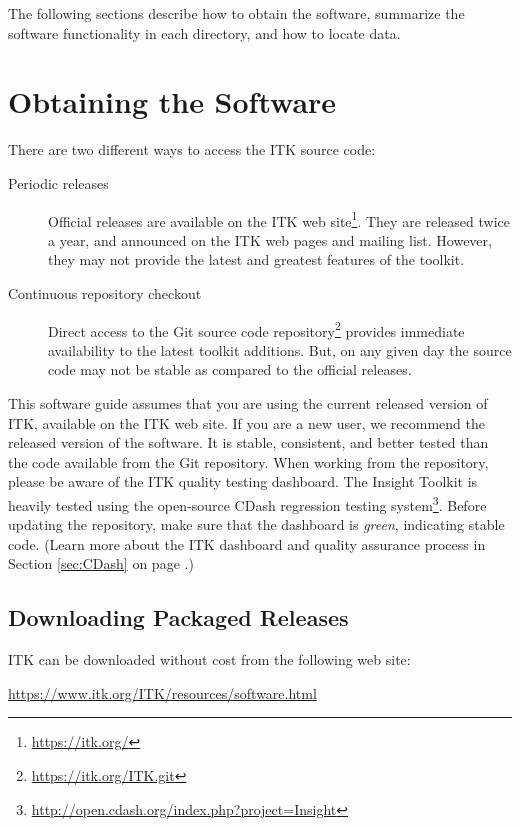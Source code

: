 The following sections describe how to obtain the software, summarize the
software functionality in each directory, and how to locate data.

\section{Obtaining the Software}
\label{sec:ObtainingTheSoftware}
\label{sec:DownloadingITK}

There are two different ways to access the ITK source code:
\begin{description}
  \item[Periodic releases]{Official releases are available on the ITK web
    site\footnote{\url{https://itk.org/}}. They are released twice a year,
    and announced on the ITK web pages and mailing list.
    However, they may not provide the latest and greatest features of the
    toolkit.}
  \item[Continuous repository checkout]{Direct access to the Git source code
    repository\footnote{\url{https://itk.org/ITK.git}} provides immediate
    availability to the latest toolkit additions. But, on any given day the
    source code may not be stable as compared to the official releases.}
\end{description}

This software guide assumes that you are using the current released version of
ITK, available on the ITK web site. If you are a new user, we recommend the
released version of the software. It is stable, consistent, and better tested
than the code available from the Git repository.  When working from the
repository, please be aware of the ITK quality testing dashboard. The Insight
Toolkit is heavily tested using the open-source CDash regression testing
system\footnote{\url{http://open.cdash.org/index.php?project=Insight}}. Before
updating the repository, make sure that the dashboard is \emph{green},
indicating stable code. (Learn more about the ITK dashboard and quality
assurance process in Section \ref{sec:CDash} on page \pageref{sec:CDash}.)

\subsection{Downloading Packaged Releases}
\label{sec:DownloadingReleases}


ITK can be downloaded without cost from the following web site:
\begin{center}
  \url{https://www.itk.org/ITK/resources/software.html}
\end{center}

